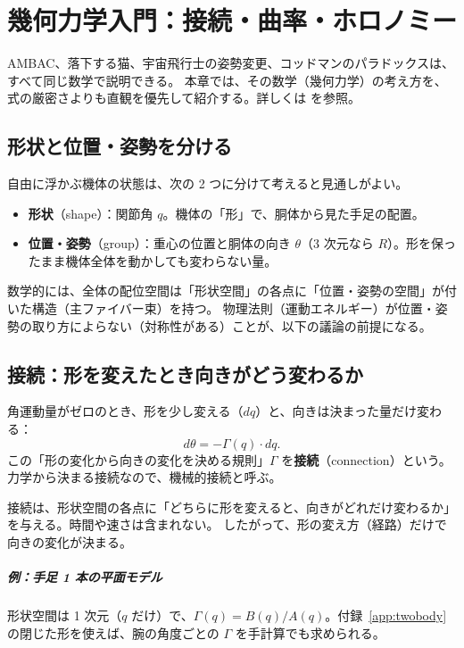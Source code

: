 \chapter{幾何力学入門：接続・曲率・ホロノミー}\label{ch:basics-geom}

AMBAC、落下する猫、宇宙飛行士の姿勢変更、コッドマンのパラドックスは、すべて同じ数学で説明できる。
本章では、その数学（幾何力学）の考え方を、式の厳密さよりも直観を優先して紹介する。詳しくは \cite{R5,R4,R6} を参照。

\section{形状と位置・姿勢を分ける}

自由に浮かぶ機体の状態は、次の 2 つに分けて考えると見通しがよい。
\begin{itemize}
\item \textbf{形状}（shape）：関節角 $q$。機体の「形」で、胴体から見た手足の配置。
\item \textbf{位置・姿勢}（group）：重心の位置と胴体の向き $\theta$（3 次元なら $R$）。形を保ったまま機体全体を動かしても変わらない量。
\end{itemize}
数学的には、全体の配位空間は「形状空間」の各点に「位置・姿勢の空間」が付いた構造（主ファイバー束）を持つ。
物理法則（運動エネルギー）が位置・姿勢の取り方によらない（対称性がある）ことが、以下の議論の前提になる。

\section{接続：形を変えたとき向きがどう変わるか}

角運動量がゼロのとき、形を少し変える（$dq$）と、向きは決まった量だけ変わる：
\begin{equation}
d\theta = -\Gamma(q)\cdot dq .
\end{equation}
この「形の変化から向きの変化を決める規則」$\Gamma$ を\textbf{接続}（connection）という。力学から決まる接続なので、機械的接続と呼ぶ。

\begin{keypoint}
接続は、形状空間の各点に「どちらに形を変えると、向きがどれだけ変わるか」を与える。時間や速さは含まれない。
したがって、形の変え方（経路）だけで向きの変化が決まる。
\end{keypoint}

\paragraph{例：手足 1 本の平面モデル}
形状空間は 1 次元（$q$ だけ）で、$\Gamma(q) = B(q)/A(q)$。付録~\ref{app:twobody} の閉じた形を使えば、腕の角度ごとの $\Gamma$ を手計算でも求められる。

